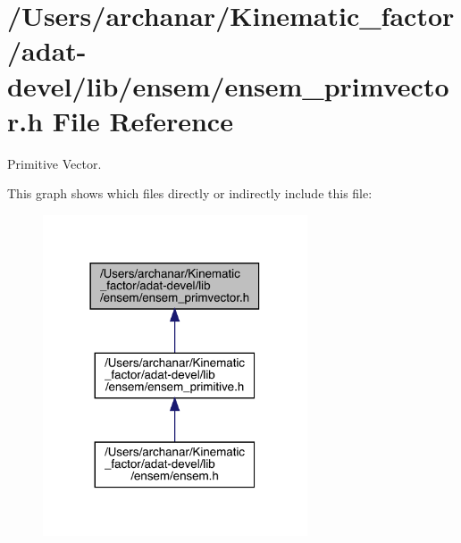 \hypertarget{adat-devel_2lib_2ensem_2ensem__primvector_8h}{}\section{/\+Users/archanar/\+Kinematic\+\_\+factor/adat-\/devel/lib/ensem/ensem\+\_\+primvector.h File Reference}
\label{adat-devel_2lib_2ensem_2ensem__primvector_8h}


Primitive Vector.  


This graph shows which files directly or indirectly include this file\+:
\nopagebreak
\begin{figure}[H]
\begin{center}
\leavevmode
\includegraphics[width=222pt]{d4/dd7/adat-devel_2lib_2ensem_2ensem__primvector_8h__dep__incl}
\end{center}
\end{figure}
